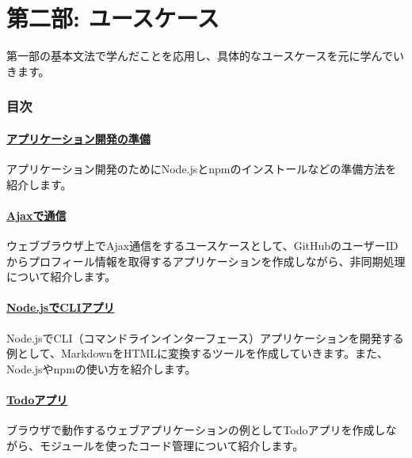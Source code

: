 \hypertarget{use-case}{%
\part{第二部: ユースケース}\label{use-case}}

第一部の基本文法で学んだことを応用し、具体的なユースケースを元に学んでいきます。

\hypertarget{summary}{%
\section*{目次}\label{summary}}

\hypertarget{setup-local-env}{%
\subsection*{\texorpdfstring{\href{./setup-local-env/README.md}{アプリケーション開発の準備}}{アプリケーション開発の準備}}\label{setup-local-env}}

アプリケーション開発のためにNode.jsとnpmのインストールなどの準備方法を紹介します。

\hypertarget{ajaxapp}{%
\subsection*{\texorpdfstring{\href{./ajaxapp/README.md}{Ajaxで通信}}{Ajaxで通信}}\label{ajaxapp}}

ウェブブラウザ上でAjax通信をするユースケースとして、GitHubのユーザーIDからプロフィール情報を取得するアプリケーションを作成しながら、非同期処理について紹介します。

\hypertarget{nodecli}{%
\subsection*{\texorpdfstring{\href{./nodecli/README.md}{Node.jsでCLIアプリ}}{Node.jsでCLIアプリ}}\label{nodecli}}

Node.jsでCLI（コマンドラインインターフェース）アプリケーションを開発する例として、MarkdownをHTMLに変換するツールを作成していきます。また、Node.jsやnpmの使い方を紹介します。

\hypertarget{todoapp}{%
\subsection*{\texorpdfstring{\href{./todoapp/README.md}{Todoアプリ}}{Todoアプリ}}\label{todoapp}}

ブラウザで動作するウェブアプリケーションの例としてTodoアプリを作成しながら、モジュールを使ったコード管理について紹介します。
